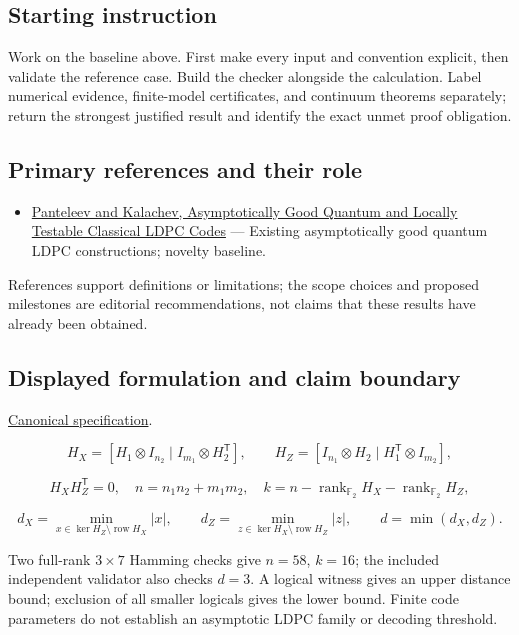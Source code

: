 \documentclass[
  11pt,
]{article}
\providecommand{\tightlist}{%
  \setlength{\itemsep}{0pt}\setlength{\parskip}{0pt}}
\begin{document}
\subsection{Starting instruction}

Work on the baseline above. First make every input and convention
explicit, then validate the reference case. Build the checker alongside
the calculation. Label numerical evidence, finite-model certificates,
and continuum theorems separately; return the strongest justified result
and identify the exact unmet proof obligation.

\subsection{Primary references and their role}

\begin{itemize}
\tightlist
\item
  \href{https://arxiv.org/abs/2111.03654}{Panteleev and Kalachev,
  Asymptotically Good Quantum and Locally Testable Classical LDPC Codes}
  --- Existing asymptotically good quantum LDPC constructions; novelty
  baseline.
\end{itemize}

References support definitions or limitations; the scope choices and
proposed milestones are editorial recommendations, not claims that these
results have already been obtained.

\subsection{Displayed formulation and claim boundary}

\href{https://github.com/rick-stevens-ai/Pure-Thought/blob/main/PRDs/21-Quantum-LDPC-Codes.md}{Canonical
specification}.

\[H_X=[H_1\otimes I_{n_2}\mid I_{m_1}\otimes H_2^{\mathsf T}],
\qquad H_Z=[I_{n_1}\otimes H_2\mid H_1^{\mathsf T}\otimes I_{m_2}],\]

\[H_XH_Z^{\mathsf T}=0,\quad n=n_1n_2+m_1m_2,\quad
k=n-\operatorname{rank}_{\mathbb F_2}H_X-\operatorname{rank}_{\mathbb F_2}H_Z,\]

\[d_X=\min_{x\in\ker H_Z\setminus\operatorname{row}H_X}|x|,
\qquad d_Z=\min_{z\in\ker H_X\setminus\operatorname{row}H_Z}|z|,
\qquad d=\min(d_X,d_Z).\]

Two full-rank \(3\times7\) Hamming checks give \(n=58\), \(k=16\); the
included independent validator also checks \(d=3\). A logical witness
gives an upper distance bound; exclusion of all smaller logicals gives
the lower bound. Finite code parameters do not establish an asymptotic
LDPC family or decoding threshold.
\end{document}
